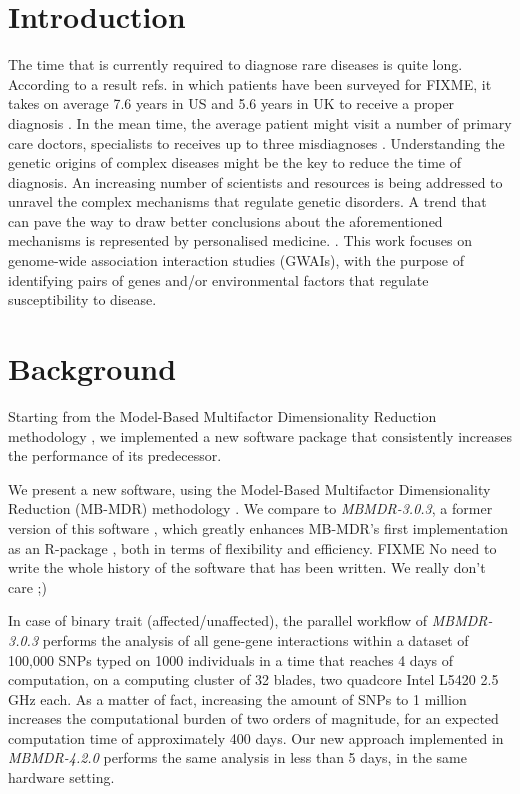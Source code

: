 \documentclass{bmcart}
\begin{document}
\section*{Introduction}
The time that is currently required to diagnose rare diseases is quite long. According to a result refs. in which patients have been surveyed for FIXME, it takes on average 7.6 years in US and 5.6 years in UK to receive a proper diagnosis \cite{Shire2013}. In the mean time, the average patient might visit a number of primary care doctors, specialists to receives up to three misdiagnoses \cite{Shire2013}. Understanding the genetic origins of complex diseases might be the key to reduce the time of diagnosis. An increasing number of scientists and resources is being addressed to unravel the complex mechanisms that regulate genetic disorders.
A trend that can pave the way to draw better conclusions about the aforementioned mechanisms is represented by personalised medicine.   
\cite{Shastry2006, VantVeer2008, Galas2009, Beevers2012, Lester2013}. This work focuses on genome-wide association interaction studies (GWAIs), with the purpose of identifying pairs of genes and/or environmental factors that regulate  susceptibility to disease.

\section*{Background}
Starting from the Model-Based Multifactor Dimensionality Reduction methodology \cite{Calle2008, Calle2008b, Cattaert2011,Mahachie2012}, we implemented a new software package that consistently increases the performance of its predecessor. 



We present a new software, using the Model-Based Multifactor Dimensionality Reduction (MB-MDR) methodology \cite{Calle2008, Calle2008b, Cattaert2011,Mahachie2012}. We compare to {\em MBMDR-3.0.3}, a former version of this software \cite{VanLishout2013}, which greatly enhances MB-MDR's first implementation as an R-package \cite{Calle2010}, both in terms of flexibility and efficiency. 
FIXME No need to write the whole history of the software that has been written. We really don't care ;)


In case of binary trait (affected/unaffected), the parallel workflow of {\em MBMDR-3.0.3} performs the analysis of all gene-gene interactions within a dataset of 100,000 SNPs typed on 1000 individuals in a time that reaches 4 days of computation, on a computing cluster of 32 blades, two quadcore Intel L5420 2.5 GHz each. As a matter of fact, increasing the amount of SNPs to 1 million increases the computational burden of two orders of magnitude, for an expected computation time of approximately 400 days. Our new approach implemented in {\em MBMDR-4.2.0} performs the same analysis in less than 5 days, in the same hardware setting.
\end{document}
